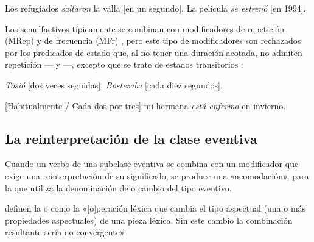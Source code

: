 \begin{exe}
  \ex\label{ex:08-valla} Los refugiados \textit{saltaron} la valla [en un
      segundo].
  \ex\label{ex:08-1994} La película \textit{se estrenó} [en 1994].
\end{exe}

Los semelfactivos típicamente se combinan con modificadores de repetición
(MRep)  y de frecuencia (MFr) , pero
este tipo de modificadores son rechazados por los predicados de estado que, al
no tener una duración acotada, no admiten repetición --- y
---, excepto que se trate de estados transitorios
:

\begin{exe}
  \ex\label{ex:08-tosio} \textit{Tosió} [dos veces seguidas].
  \ex\label{ex:08-bostezaba} \textit{Bostezaba} [cada diez segundos].
  \ex
    \begin{xlist}
      \ex\label{ex:08-enferma-b} {}[Habitualmente / Cada dos por tres] mi hermana
          \textit{está enferma} en invierno.
    \end{xlist}
\end{exe}

\subsection{La reinterpretación de la clase eventiva}\label{sec:08-coercion}

Cuando un verbo de una subclase eventiva se combina con un modificador que exige
una reinterpretación de su significado, se produce una «acomodación», para la
que \textcite{pustejovsky1995} utiliza la denominación de
 o cambio del tipo eventivo.

\begin{destacado}
\textcite[330]{bosque2009} definen la  o 
como la «[o]peración léxica que cambia el tipo aspectual (una o más propiedades
aspectuales) de una pieza léxica. Sin este cambio la combinación resultante
sería no convergente».
\end{destacado}

